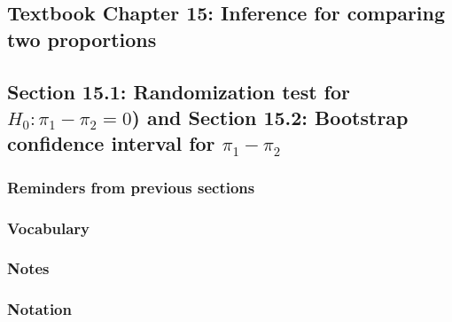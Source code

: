 \documentclass[
]{report}
\begin{document}
\hypertarget{textbook-chapter-15-inference-for-comparing-two-proportions}{%
\subsection*{Textbook Chapter 15: Inference for comparing two proportions}\label{textbook-chapter-15-inference-for-comparing-two-proportions}}

\hypertarget{section-15.1-randomization-test-for-h_0-pi_1---pi_2-0-and-section-15.2-bootstrap-confidence-interval-for-pi_1---pi_2}{%
\subsection*{\texorpdfstring{Section 15.1: Randomization test for \(H_0: \pi_1 - \pi_2 = 0\)) and Section 15.2: Bootstrap confidence interval for \(\pi_1 - \pi_2\)}{Section 15.1: Randomization test for H\_0: \textbackslash pi\_1 - \textbackslash pi\_2 = 0) and Section 15.2: Bootstrap confidence interval for \textbackslash pi\_1 - \textbackslash pi\_2}}\label{section-15.1-randomization-test-for-h_0-pi_1---pi_2-0-and-section-15.2-bootstrap-confidence-interval-for-pi_1---pi_2}}

\hypertarget{reminders-from-previous-sections-7}{%
\subsubsection*{Reminders from previous sections}\label{reminders-from-previous-sections-7}}

\hypertarget{vocabulary-16}{%
\subsubsection*{Vocabulary}\label{vocabulary-16}}

\hypertarget{notes-20}{%
\subsubsection*{Notes}\label{notes-20}}

\hypertarget{notation}{%
\subsubsection*{Notation}\label{notation}}
\end{document}
